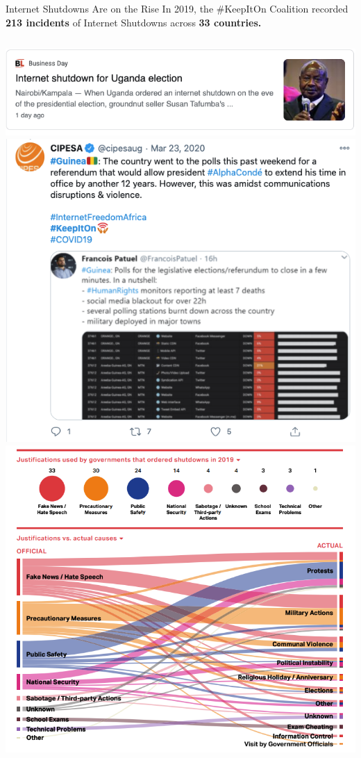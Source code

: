 \documentclass[nobackground,dvipsnames,table,aspectratio=169]{beamer}
\begin{document}
\begin{frame}{Internet Shutdowns Are on the Rise}
    \small{In 2019, the \#KeepItOn Coalition recorded \textbf{213 incidents} of Internet Shutdowns across \textbf{33 countries.}}
    \begin{columns}
            \includegraphics[width=\textwidth]{unganda-internet-shutdown}
            \includegraphics[width=\textwidth]{guinea-internet-disruptions}
            \includegraphics[width=\textwidth]{shutdown-justifications}
    \end{columns}
\end{frame}
\end{document}
